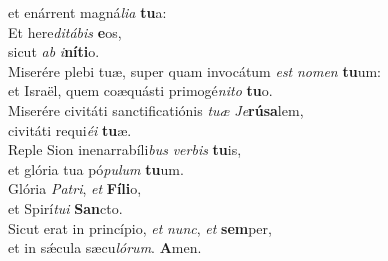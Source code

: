 \evenverse et enárrent magná\textit{li}\textit{a} \textbf{tu}a:\\
\oddverse Et here\textit{di}\textit{tá}\textit{bis} \textbf{e}os,~\*\\
\oddverse sicut \textit{ab} \textit{i}\textbf{ní}\textbf{ti}o.\\
\evenverse Miserére plebi tuæ, super quam invocátum \textit{est} \textit{no}\textit{men} \textbf{tu}um:~\*\\
\evenverse et Israël, quem coæquásti primogé\textit{ni}\textit{to} \textbf{tu}o.\\
\oddverse Miserére civitáti sanctificatiónis \textit{tu}\textit{æ} \textit{Je}\textbf{rú}\textbf{sa}lem,~\*\\
\oddverse civitáti requi\textit{é}\textit{i} \textbf{tu}æ.\\
\evenverse Reple Sion inenarrabíli\textit{bus} \textit{ver}\textit{bis} \textbf{tu}is,~\*\\
\evenverse et glória tua pó\textit{pu}\textit{lum} \textbf{tu}um.\\
\oddverse Glória \textit{Pa}\textit{tri}, \textit{et} \textbf{Fí}\textbf{li}o,~\*\\
\oddverse et Spirí\textit{tu}\textit{i} \textbf{San}cto.\\
\evenverse Sicut erat in princípio, \textit{et} \textit{nunc}, \textit{et} \textbf{sem}per,~\*\\
\evenverse et in sǽcula sæcu\textit{ló}\textit{rum}. \textbf{A}men.\\
